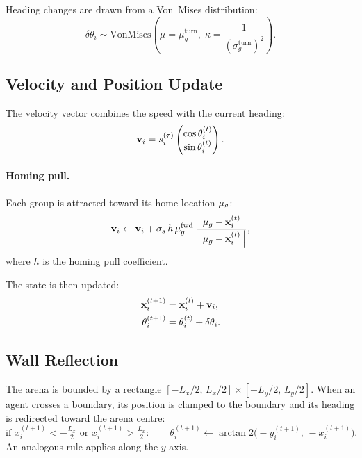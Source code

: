 Heading changes are drawn from a Von~Mises distribution:
%
\begin{equation}\label{eq:vonmises}
  \delta\theta_i \sim \mathrm{VonMises}\!\left(
    \mu = \mu_g^{\mathrm{turn}},\;
    \kappa = \frac{1}{(\sigma_g^{\mathrm{turn}})^2}
  \right).
\end{equation}

\subsection{Velocity and Position Update}

The velocity vector combines the speed with the current heading:
%
\begin{equation}
  \mathbf{v}_i = s_i^{(\tau)} \begin{pmatrix} \cos\theta_i^{(t)} \\ \sin\theta_i^{(t)} \end{pmatrix}.
\end{equation}

\paragraph{Homing pull.}
Each group is attracted toward its home location $\mathbf{\mu}_g$:
%
\begin{equation}
  \mathbf{v}_i \leftarrow \mathbf{v}_i
    + \sigma_s \, h \, \mu_g^{\mathrm{fwd}}
      \;\frac{\mathbf{\mu}_g - \mathbf{x}_i^{(t)}}
             {\left\lVert \mathbf{\mu}_g - \mathbf{x}_i^{(t)} \right\rVert},
\end{equation}
%
where $h$ is the homing pull coefficient.

The state is then updated:
%
\begin{align}
  \mathbf{x}_i^{(t+1)} &= \mathbf{x}_i^{(t)} + \mathbf{v}_i, \\
  \theta_i^{(t+1)}    &= \theta_i^{(t)} + \delta\theta_i.
\end{align}

\subsection{Wall Reflection}

The arena is bounded by a rectangle
$[{-L_x/2},\, {L_x/2}] \times [{-L_y/2},\, {L_y/2}]$.
When an agent crosses a boundary, its position is clamped to the boundary and
its heading is redirected toward the arena centre:
%
\begin{equation}
  \text{if } x_i^{(t+1)} < -\tfrac{L_x}{2} \text{ or } x_i^{(t+1)} > \tfrac{L_x}{2}:
  \qquad
  \theta_i^{(t+1)} \leftarrow \arctan2\!\bigl(-y_i^{(t+1)},\, -x_i^{(t+1)}\bigr).
\end{equation}
%
An analogous rule applies along the $y$-axis.

